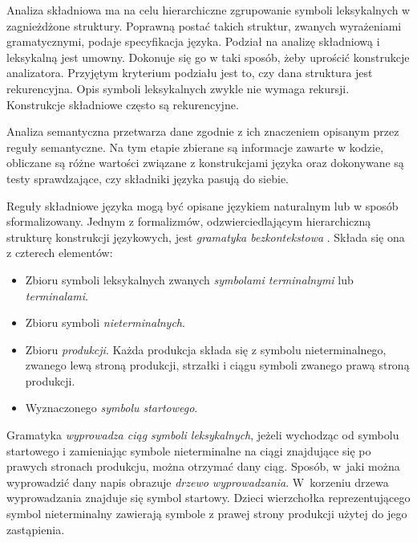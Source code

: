 Analiza składniowa ma na celu hierarchiczne zgrupowanie symboli leksykalnych 
w zagnieżdżone struktury. Poprawną postać takich struktur, zwanych wyrażeniami gramatycznymi,
podaje specyfikacja języka. Podział na analizę składniową i leksykalną jest umowny.
Dokonuje się go w taki sposób, żeby uprościć konstrukcje analizatora. Przyjętym kryterium podziału
jest to, czy dana struktura jest rekurencyjna. Opis symboli leksykalnych zwykle nie wymaga rekursji.
Konstrukcje składniowe często są rekurencyjne.

Analiza semantyczna przetwarza dane zgodnie z ich znaczeniem opisanym przez reguły semantyczne.
Na tym etapie zbierane są informacje zawarte w kodzie, obliczane są różne wartości związane
z konstrukcjami języka oraz dokonywane są testy sprawdzające, czy składniki języka pasują do siebie.

Reguły składniowe języka mogą być opisane językiem naturalnym lub w sposób sformalizowany.
Jednym z formalizmów, odzwierciedlającym hierarchiczną strukturę konstrukcji językowych,
jest \emph{gramatyka bezkontekstowa} \cite{compilers}. Składa się ona z czterech elementów:

\begin{itemize}
\item Zbioru symboli leksykalnych zwanych \emph{symbolami terminalnymi} lub \emph{terminalami}.
\item Zbioru symboli \emph{nieterminalnych}.
\item Zbioru \emph{produkcji}. Każda produkcja składa się z symbolu nieterminalnego,
  zwanego lewą stroną produkcji, strzałki i ciągu symboli zwanego prawą stroną produkcji.
\item Wyznaczonego \emph{symbolu startowego}.
\end{itemize}

Gramatyka \emph{wyprowadza ciąg symboli leksykalnych}, jeżeli wychodząc 
od symbolu startowego i zamieniając symbole nieterminalne na ciągi znajdujące 
się po prawych stronach produkcju, można otrzymać dany ciąg. Sposób, w~jaki
można wyprowadzić dany napis obrazuje \emph{drzewo wyprowadzania}. W~korzeniu drzewa wyprowadzania
znajduje się symbol startowy. Dzieci wierzchołka reprezentującego symbol nieterminalny
zawierają symbole z prawej strony produkcji użytej do jego zastąpienia.


